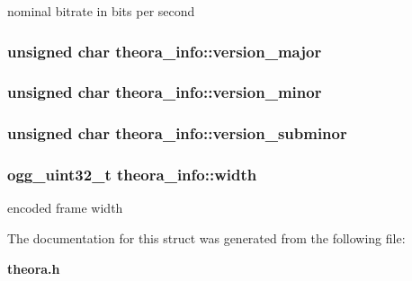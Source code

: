 nominal bitrate in bits per second 

\subsubsection[{version\-\_\-major}]{\setlength{\rightskip}{0pt plus 5cm}unsigned char {\bf theora\-\_\-info\-::version\-\_\-major}}\label{structtheora__info_a7c5ebb9e6700aaef87f29f7c6074e474}
\subsubsection[{version\-\_\-minor}]{\setlength{\rightskip}{0pt plus 5cm}unsigned char {\bf theora\-\_\-info\-::version\-\_\-minor}}\label{structtheora__info_a75eda4f30270d833c7b9dba43932a06a}
\subsubsection[{version\-\_\-subminor}]{\setlength{\rightskip}{0pt plus 5cm}unsigned char {\bf theora\-\_\-info\-::version\-\_\-subminor}}\label{structtheora__info_aa07967ecd6e20bd2928ead42b6397b3d}
\subsubsection[{width}]{\setlength{\rightskip}{0pt plus 5cm}ogg\-\_\-uint32\-\_\-t {\bf theora\-\_\-info\-::width}}\label{structtheora__info_a17c2fc651bb3329f1ea6b13ff1d3957b}


encoded frame width 



\-The documentation for this struct was generated from the following file\-:\begin{DoxyCompactItemize}
\item 
{\bf theora.\-h}\end{DoxyCompactItemize}
